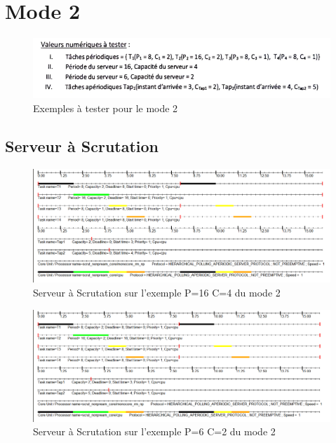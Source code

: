 \section{Mode 2}{
  \bigskip\begin{figure}[H]
    \centering
    \includegraphics[width=16cm]{
      img/mode2/exemples.png
    }
    \caption{Exemples à tester pour le mode 2}
  \end{figure}\bigskip


  \subsection{Serveur à Scrutation}{
    \begin{figure}[H]
      \centering
      \includegraphics[width=16cm]{
        img/mode2/scr/scr_p16_c4.png
      }
      \caption{Serveur à Scrutation sur l'exemple P=16 C=4 du mode 2}
    \end{figure}

    \begin{figure}[H]
      \centering
      \includegraphics[width=16cm]{
        img/mode2/scr/scr_p6_c2.png
      }
      \caption{Serveur à Scrutation sur l'exemple P=6 C=2 du mode 2}
    \end{figure}
  }

}
